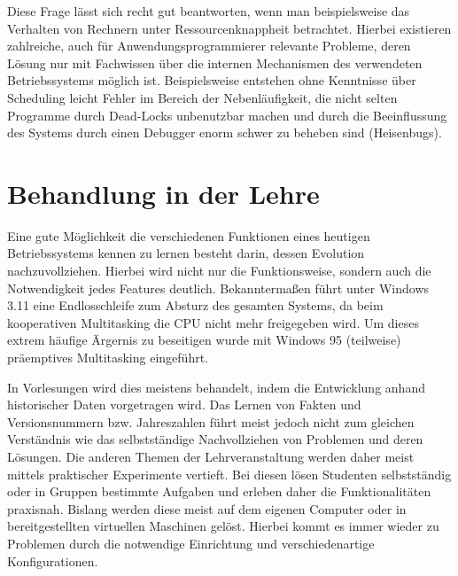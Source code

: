 		Diese Frage lässt sich recht gut beantworten, wenn man beispielsweise das Verhalten von Rechnern unter Ressourcenknappheit betrachtet.
		Hierbei existieren zahlreiche, auch für Anwendungsprogrammierer relevante Probleme, deren Lösung nur mit Fachwissen über die internen Mechanismen des verwendeten Betriebssystems möglich ist. 
		Beispielsweise entstehen ohne Kenntnisse über Scheduling leicht Fehler im Bereich der Nebenläufigkeit, die nicht selten Programme durch Dead-Locks unbenutzbar machen und durch die Beeinflussung des Systems durch einen Debugger enorm schwer zu beheben sind (Heisenbugs).





\section{Behandlung in der Lehre}
\label{sec:teaching}

		Eine gute Möglichkeit die verschiedenen Funktionen eines heutigen Betriebssystems kennen zu lernen besteht darin, dessen Evolution nachzuvollziehen. Hierbei wird nicht nur die Funktionsweise, sondern auch die Notwendigkeit jedes Features deutlich. 
		Bekanntermaßen führt unter Windows 3.11 eine Endlosschleife zum Absturz des gesamten Systems, da beim kooperativen Multitasking die CPU nicht mehr freigegeben wird.
		Um dieses extrem häufige Ärgernis zu beseitigen wurde mit Windows 95 (teilweise) präemptives Multitasking eingeführt.

		In Vorlesungen wird dies meistens behandelt, indem  die Entwicklung anhand historischer Daten vorgetragen wird.
		Das Lernen von Fakten und Versionsnummern bzw. Jahreszahlen führt meist jedoch nicht zum gleichen Verständnis wie das selbstständige Nachvollziehen von Problemen und deren Lösungen.
		Die anderen Themen der Lehrveranstaltung werden daher meist mittels praktischer Experimente vertieft.
		Bei diesen lösen Studenten selbstständig oder in Gruppen bestimmte Aufgaben und erleben daher die Funktionalitäten praxisnah.
		Bislang werden diese meist auf dem eigenen Computer oder in bereitgestellten virtuellen Maschinen gelöst.
		Hierbei kommt es immer wieder zu Problemen durch die notwendige Einrichtung und verschiedenartige Konfigurationen.

